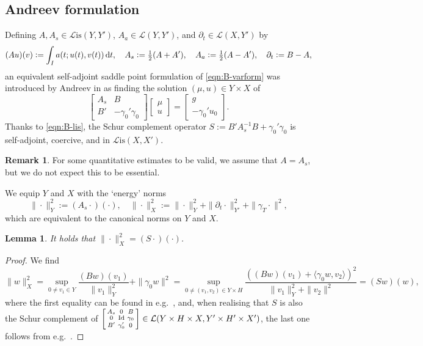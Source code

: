 \documentclass[11pt,a4paper,oneside,english]{amsart}
\numberwithin{equation}{section}
\numberwithin{theorem}{section}
\newtheorem{lemma}[theorem]{Lemma}
\theoremstyle{definition}
\newtheorem{remark}[theorem]{Remark}
\newcommand{\la}{\langle}
\newcommand{\ra}{\rangle}
\DeclareMathOperator*{\Id}{Id}
\newcommand{\cL}{\mathcal L}
\newcommand{\Lis}{\cL\mathrm{is}}
\begin{document}
\subsection{Andreev formulation}
Defining $A, A_s \in \Lis(Y,Y')$, $A_a \in \cL(Y,Y')$, and $\partial_t \in \cL(X,Y')$ by
\[
(Au)(v):=\int_I a(t;u(t),v(t)) \dif t, \quad A_s:=\tfrac12(A+A'), \quad A_a:=\tfrac12(A-A'), \quad \partial_t:=B-A,
\]
an equivalent self-adjoint saddle point formulation of \eqref{eqn:B-varform} was
introduced by Andreev in \cite{Andreev2013} as finding the solution $(\mu,u) \in Y\times X$ of
\[
  \begin{bmatrix} A_s & B\\ B' & -\gamma_0' \gamma_0 \end{bmatrix}
  \begin{bmatrix} \mu \\ u \end{bmatrix}=
  \begin{bmatrix} g \\ -\gamma_0' u_0 \end{bmatrix}.
\]
Thanks to \eqref{eqn:B-lis}, the Schur complement operator $S := B' A_s^{-1} B+\gamma_0'\gamma_0$ is self-adjoint, coercive, and in $\Lis(X, X')$.

\begin{remark}
  For some quantitative estimates to be valid, we assume that $A=A_s$, but we do not expect this to be essential.
\end{remark}
We equip $Y$ and $X$ with the `energy' norms
$$
\|\cdot\|_Y^2:=(A_s\cdot)(\cdot),\quad \|\cdot\|_X^2:=\|\cdot\|_Y^2+\|\partial_t \cdot\|_{Y'}^2+\|\gamma_T \cdot\|^2,
$$
which are equivalent to the canonical norms on $Y$ and $X$.

\begin{lemma}
  \label{lem:energy-norm}
  It holds that $\|\cdot\|_X^2=(S\cdot)(\cdot)$.
\end{lemma}
\begin{proof}
  We find
  \[
    \|w\|_X^2=\sup_{0 \neq v_1 \in Y} \frac{(B w)(v_1)}{\|v_1\|_Y^2}+\|\gamma_0 w\|^2
    =\sup_{0 \neq (v_1,v_2) \in Y \times H} \frac{((B w)(v_1)+\la \gamma_0 w,v_2\ra)^2}{\|v_1\|_Y^2+\|v_2\|^2} =(Sw)(w),
  \]
  where the first equality can be found in e.g.~\cite[Thm.~2.1]{Ern2017a}, and,
  when realising that $S$ is also the Schur complement of
  $\begin{bsmallmatrix} A_s & 0 & B\\ 0 & \Id & \gamma_0\\ B' & \gamma_0' & 0\end{bsmallmatrix} \in \cL(Y\times H \times X, Y'\times H'\times X')$, the last one follows from e.g.~\cite[Lemma~2.2]{Kondratyuk2008}.
\end{proof}
\end{document}
